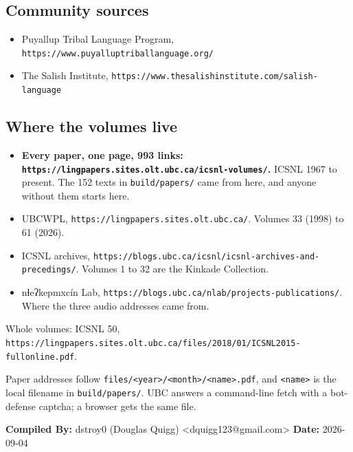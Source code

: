 \subsection{Community sources}

\begin{itemize}
\item Puyallup Tribal Language Program, \texttt{https:/\allowbreak{}/\allowbreak{}www.\allowbreak{}puyalluptriballanguage.\allowbreak{}org/\allowbreak{}}
\item The Salish Institute, \texttt{https:/\allowbreak{}/\allowbreak{}www.\allowbreak{}thesalishinstitute.\allowbreak{}com/\allowbreak{}salish-\allowbreak{}language}
\end{itemize}

\subsection{Where the volumes live}

\begin{itemize}
\item \textbf{Every paper, one page, 993 links: \texttt{https:/\allowbreak{}/\allowbreak{}lingpapers.\allowbreak{}sites.\allowbreak{}olt.\allowbreak{}ubc.\allowbreak{}ca/\allowbreak{}icsnl-\allowbreak{}volumes/\allowbreak{}}.} ICSNL 1967 to present. The 152 texts in \texttt{build/\allowbreak{}papers/\allowbreak{}} came from here, and anyone without them starts here.
\item UBCWPL, \texttt{https:/\allowbreak{}/\allowbreak{}lingpapers.\allowbreak{}sites.\allowbreak{}olt.\allowbreak{}ubc.\allowbreak{}ca/\allowbreak{}}. Volumes 33 (1998) to 61 (2026).
\item ICSNL archives, \texttt{https:/\allowbreak{}/\allowbreak{}blogs.\allowbreak{}ubc.\allowbreak{}ca/\allowbreak{}icsnl/\allowbreak{}icsnl-\allowbreak{}archives-\allowbreak{}and-\allowbreak{}precedings/\allowbreak{}}. Volumes 1 to 32 are the Kinkade Collection.
\item nɬeʔkepmxcín Lab, \texttt{https:/\allowbreak{}/\allowbreak{}blogs.\allowbreak{}ubc.\allowbreak{}ca/\allowbreak{}nlab/\allowbreak{}projects-\allowbreak{}publications/\allowbreak{}}. Where the three audio addresses came from.
\end{itemize}

Whole volumes: ICSNL 50, \texttt{https:/\allowbreak{}/\allowbreak{}lingpapers.\allowbreak{}sites.\allowbreak{}olt.\allowbreak{}ubc.\allowbreak{}ca/\allowbreak{}files/\allowbreak{}2018/\allowbreak{}01/\allowbreak{}ICSNL2015-\allowbreak{}fullonline.\allowbreak{}pdf}.

Paper addresses follow \texttt{files/\allowbreak{}<year>/\allowbreak{}<month>/\allowbreak{}<name>.\allowbreak{}pdf}, and \texttt{<name>} is the local filename in \texttt{build/\allowbreak{}papers/\allowbreak{}}. UBC answers a command-line fetch with a bot-defense captcha; a browser gets the same file.

\textbf{Compiled By:} dstroy0 (Douglas Quigg) <dquigg123@gmail.com> \textbf{Date:} 2026-09-04

